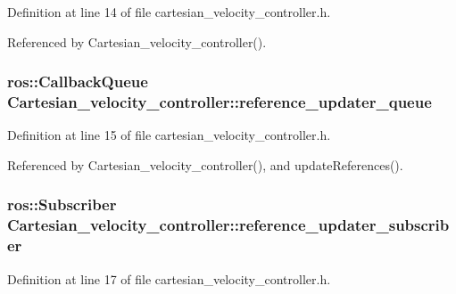 Definition at line 14 of file cartesian\-\_\-velocity\-\_\-controller.\-h.



Referenced by Cartesian\-\_\-velocity\-\_\-controller().

\hypertarget{classCartesian__velocity__controller_ad2804cf83a42305d18572abdbbfd1c3f}{
\subsubsection[{reference\-\_\-updater\-\_\-queue}]{\setlength{\rightskip}{0pt plus 5cm}ros\-::\-Callback\-Queue Cartesian\-\_\-velocity\-\_\-controller\-::reference\-\_\-updater\-\_\-queue\hspace{0.3cm}{\ttfamily [protected]}}}\label{classCartesian__velocity__controller_ad2804cf83a42305d18572abdbbfd1c3f}


Definition at line 15 of file cartesian\-\_\-velocity\-\_\-controller.\-h.



Referenced by Cartesian\-\_\-velocity\-\_\-controller(), and update\-References().

\hypertarget{classCartesian__velocity__controller_a75412b9859afe4b800f9613c9cb8d17f}{
\subsubsection[{reference\-\_\-updater\-\_\-subscriber}]{\setlength{\rightskip}{0pt plus 5cm}ros\-::\-Subscriber Cartesian\-\_\-velocity\-\_\-controller\-::reference\-\_\-updater\-\_\-subscriber\hspace{0.3cm}{\ttfamily [protected]}}}\label{classCartesian__velocity__controller_a75412b9859afe4b800f9613c9cb8d17f}


Definition at line 17 of file cartesian\-\_\-velocity\-\_\-controller.\-h.



